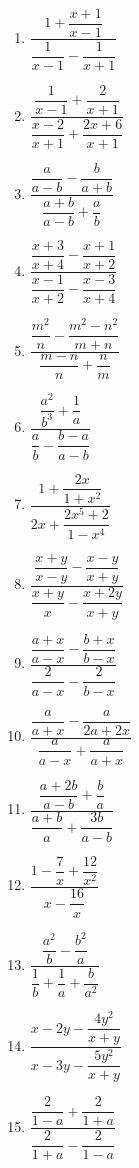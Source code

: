 \documentclass{article}
\begin{document}
\begin{enumerate}[label=\bfseries\small 138.\arabic*, itemsep=2.5cm]
\large


\item $\dfrac{1 + \dfrac{x + 1}{x - 1}}{\dfrac{1}{x - 1} - \dfrac{1}{x + 1}}$

\item $\dfrac{\dfrac{1}{x - 1} + \dfrac{2}{x + 1}}{\dfrac{x - 2}{x + 1} + \dfrac{2x + 6}{x + 1}}$

\item $\dfrac{\dfrac{a}{a - b} - \dfrac{b}{a + b}}{\dfrac{a + b}{a - b} + \dfrac{a}{b}}$

\item $\dfrac{\dfrac{x+3}{x+4} - \dfrac{x+1}{x+2}}{\dfrac{x-1}{x+2} - \dfrac{x-3}{x+4}}$ 

\item $\dfrac{\dfrac{m^2}{n} - \dfrac{m^2-n^2}{m+n}}{\dfrac{m-n}{n} + \dfrac{n}{m}}$ 

\item $\dfrac{\dfrac{a^2}{b^3} + \dfrac{1}{a}}{\dfrac{a}{b} - \dfrac{b-a}{a-b}}$ 

\item $\dfrac{1 + \dfrac{2x}{1 + x^2}}{2x + \dfrac{2x^5 + 2}{1 - x^4}}$

\item $\dfrac{\dfrac{x + y}{x - y} - \dfrac{x - y}{x + y}}{\dfrac{x + y}{x} - \dfrac{x + 2y}{x + y}}$ 

\item $\dfrac{\dfrac{a + x}{a - x} - \dfrac{b + x}{b - x}}{\dfrac{2}{a - x} - \dfrac{2}{b - x}}$ 

\item $\dfrac{\dfrac{a}{a + x} - \dfrac{a}{2a + 2x}}{\dfrac{a}{a - x} + \dfrac{a}{a + x}}$

\item $\dfrac{\dfrac{a + 2b}{a - b} + \dfrac{b}{a}}{\dfrac{a + b}{a} + \dfrac{3b}{a - b}}$ 

\item $\dfrac{1 - \dfrac{7}{x} + \dfrac{12}{x^2}}{x - \dfrac{16}{x}}$ 

\item $\dfrac{\dfrac{a^2}{b} - \dfrac{b^2}{a}}{\dfrac{1}{b} + \dfrac{1}{a} + \dfrac{b}{a^2}}$

\item $\dfrac{x - 2y - \dfrac{4y^2}{x+y}}{x - 3y - \dfrac{5y^2}{x+y}}$

\item $\dfrac{\dfrac{2}{1-a} + \dfrac{2}{1+a}}{\dfrac{2}{1+a} - \dfrac{2}{1-a}}$ 


\end{enumerate}
\end{document}
